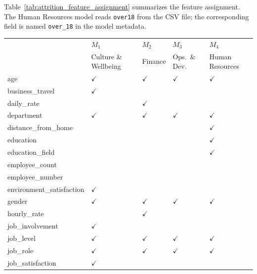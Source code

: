 \documentclass{interact}
\begin{document}
Table~\ref{tab:attrition_feature_assignment} summarizes the feature assignment. The Human Resources model reads \texttt{over18} from the CSV file; the corresponding field is named \texttt{over\_18} in the model metadata.

\begin{table}[!tb]
{\footnotesize
\begin{tabularx}{\textwidth}{%
  >{\raggedright\arraybackslash\ttfamily}X
  >{\centering\arraybackslash}p{1.55cm}
  >{\centering\arraybackslash}p{1.55cm}
  >{\centering\arraybackslash}p{1.55cm}
  >{\centering\arraybackslash}p{1.55cm}
}
\toprule
\multicolumn{1}{l}{\normalfont\textbf{Predictor}} &
\textbf{\boldmath$M_1$} &
\textbf{\boldmath$M_2$} &
\textbf{\boldmath$M_3$} &
\textbf{\boldmath$M_4$} \\
& {\scriptsize Culture \& Wellbeing} &
{\scriptsize Finance} &
{\scriptsize Ops.\ \& Dev.} &
{\scriptsize Human Resources} \\
\midrule
age & $\checkmark$ & $\checkmark$ & $\checkmark$ & $\checkmark$ \\
business\_travel & $\checkmark$ &  &  &  \\
daily\_rate &  & $\checkmark$ &  &  \\
department & $\checkmark$ & $\checkmark$ & $\checkmark$ & $\checkmark$ \\
distance\_from\_home &  &  &  & $\checkmark$ \\
education &  &  &  & $\checkmark$ \\
education\_field &  &  &  & $\checkmark$ \\
employee\_count &  &  &  &  \\
employee\_number &  &  &  &  \\
environment\_satisfaction & $\checkmark$ &  &  &  \\
gender & $\checkmark$ & $\checkmark$ & $\checkmark$ & $\checkmark$ \\
hourly\_rate &  & $\checkmark$ &  &  \\
job\_involvement & $\checkmark$ &  &  &  \\
job\_level & $\checkmark$ & $\checkmark$ & $\checkmark$ & $\checkmark$ \\
job\_role & $\checkmark$ & $\checkmark$ & $\checkmark$ & $\checkmark$ \\
job\_satisfaction & $\checkmark$ &  &  &  \\

\end{tabularx}}
\end{table}
\end{document}
